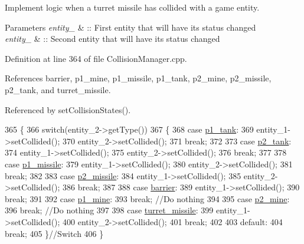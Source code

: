 Implement logic when a turret missile has collided with a game entity. 


\begin{DoxyParams}{Parameters}
{\em entity\-\_} & \-:\-: First entity that will have its status changed \\
\hline
{\em entity\-\_} & \-:\-: Second entity that will have its status changed \\
\hline
\end{DoxyParams}


Definition at line 364 of file Collision\-Manager.\-cpp.



References barrier, p1\-\_\-mine, p1\-\_\-missile, p1\-\_\-tank, p2\-\_\-mine, p2\-\_\-missile, p2\-\_\-tank, and turret\-\_\-missile.



Referenced by set\-Collision\-States().


\begin{DoxyCode}
365 \{
366     \textcolor{keywordflow}{switch}(entity\_2->getType())
367     \{
368     \textcolor{keywordflow}{case} \hyperlink{Structures_8h_a6d8f83e710b27d4f86c45f0bb77066e3a31fa78b2b7dd774f5158a16ef230932e}{p1\_tank}:
369         entity\_1->setCollided();
370         entity\_2->setCollided();
371         \textcolor{keywordflow}{break};
372 
373     \textcolor{keywordflow}{case} \hyperlink{Structures_8h_a6d8f83e710b27d4f86c45f0bb77066e3a3d48d62c7b88e7ee171698fe56dc9e59}{p2\_tank}:
374         entity\_1->setCollided();
375         entity\_2->setCollided();
376         \textcolor{keywordflow}{break};
377 
378     \textcolor{keywordflow}{case} \hyperlink{Structures_8h_a6d8f83e710b27d4f86c45f0bb77066e3af89bc631e9b0140ed004b5ce2db5330c}{p1\_missile}:
379         entity\_1->setCollided();
380         entity\_2->setCollided();
381         \textcolor{keywordflow}{break};
382 
383     \textcolor{keywordflow}{case} \hyperlink{Structures_8h_a6d8f83e710b27d4f86c45f0bb77066e3a47100170e5852d632dfe65582a18256d}{p2\_missile}:
384         entity\_1->setCollided();
385         entity\_2->setCollided();
386         \textcolor{keywordflow}{break};
387 
388     \textcolor{keywordflow}{case} \hyperlink{Structures_8h_a6d8f83e710b27d4f86c45f0bb77066e3a6fb040c958f554e1d8320926b700b59d}{barrier}:
389         entity\_1->setCollided();
390         \textcolor{keywordflow}{break};
391 
392     \textcolor{keywordflow}{case} \hyperlink{Structures_8h_a6d8f83e710b27d4f86c45f0bb77066e3afc52e626787e982ae5d0a747bed6666d}{p1\_mine}:
393         \textcolor{keywordflow}{break}; \textcolor{comment}{//Do nothing}
394 
395     \textcolor{keywordflow}{case} \hyperlink{Structures_8h_a6d8f83e710b27d4f86c45f0bb77066e3ada293b37940e64ec2cf6dbd2ae493d2b}{p2\_mine}:
396         \textcolor{keywordflow}{break}; \textcolor{comment}{//Do nothing}
397 
398     \textcolor{keywordflow}{case} \hyperlink{Structures_8h_a6d8f83e710b27d4f86c45f0bb77066e3a8f552a1e495ced5aa8775faa1b6a757b}{turret\_missile}:
399         entity\_1->setCollided();
400         entity\_2->setCollided();
401         \textcolor{keywordflow}{break};
402 
403     \textcolor{keywordflow}{default}:
404         \textcolor{keywordflow}{break};
405     \}\textcolor{comment}{//Switch}
406 \}
\end{DoxyCode}


